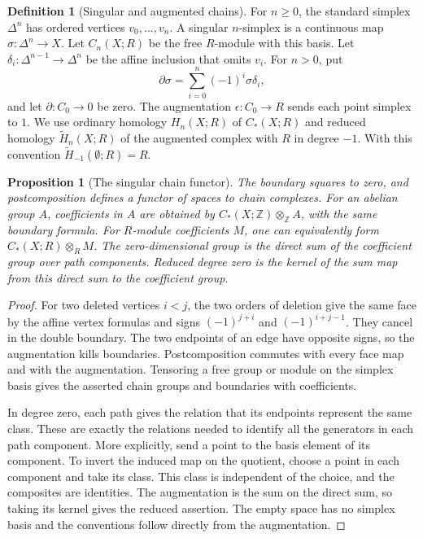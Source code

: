 \documentclass[11pt,oneside,openany]{book}
\theoremstyle{plain}
\newtheorem{proposition}[theorem]{Proposition}
\theoremstyle{definition}
\newtheorem{definition}[theorem]{Definition}
\theoremstyle{remark}
\begin{document}
\begin{definition}[Singular and augmented chains]
For \(n\ge0\), the standard simplex \(\Delta^n\) has ordered
vertices \(v_0,\ldots,v_n\). A singular \(n\)-simplex is a
continuous map \(\sigma:\Delta^n\to X\). Let \(C_n(X;R)\)
be the free \(R\)-module with this basis. Let
\(\delta_i:\Delta^{n-1}\to\Delta^n\) be the affine
inclusion that omits \(v_i\). For \(n>0\), put
\[
 \partial\sigma=\sum_{i=0}^n(-1)^i\sigma\delta_i ,
\]
and let \(\partial:C_0\to 0\) be zero. The augmentation
\(\epsilon:C_0\to R\) sends each point simplex to \(1\).
We use ordinary homology \(H_n(X;R)\) of \(C_*(X;R)\)
and reduced homology \(\widetilde H_n(X;R)\) of the
augmented complex with \(R\) in degree \(-1\).
With this convention \(\widetilde H_{-1}(\emptyset;R)=R\).
\end{definition}

\begin{proposition}[The singular chain functor]
\label{prop:p202-singular-functor}
The boundary squares to zero, and postcomposition defines
a functor of spaces to chain complexes. For an abelian
group \(A\), coefficients in \(A\) are obtained by
\(C_*(X;\mathbb Z)\otimes_{\mathbb Z} A\), with the same
boundary formula. For \(R\)-module coefficients \(M\),
one can equivalently form \(C_*(X;R)\otimes_R M\).
The zero-dimensional group is the direct sum of the
coefficient group over path components. Reduced degree
zero is the kernel of the sum map from this direct sum
to the coefficient group.
\end{proposition}

\begin{proof}
For two deleted vertices \(i<j\), the two orders of deletion
give the same face by the affine vertex formulas and
signs \((-1)^{j+i}\) and \((-1)^{i+j-1}\). They cancel
in the double boundary. The two endpoints of an edge have
opposite signs, so the augmentation kills boundaries.
Postcomposition commutes with every face map and with
the augmentation. Tensoring a free group or module on
the simplex basis gives the asserted chain groups and
boundaries with coefficients.

In degree zero, each path gives the relation that its
endpoints represent the same class. These are exactly the
relations needed to identify all the generators in each
path component. More explicitly, send a point to the
basis element of its component. To invert the induced
map on the quotient, choose a point in each component
and take its class. This class is independent of the
choice, and the composites are identities. The augmentation
is the sum on the direct sum, so taking its kernel gives
the reduced assertion. The empty space has no simplex
basis and the conventions follow directly from the
augmentation.
\end{proof}
\end{document}
